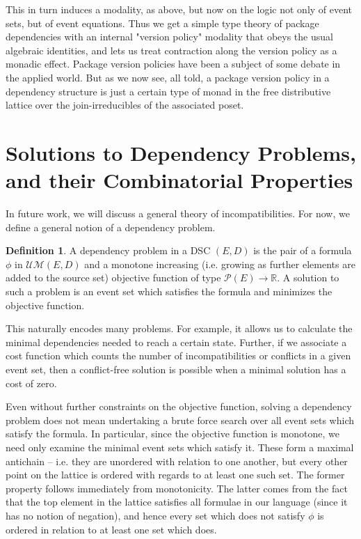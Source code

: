 \documentclass[hoptionsi,review,format=acmsmall]{acmart}
\theoremstyle{definition}
\newtheorem{definition}{Definition}[section]
\newcommand{\UMc}{\mathcal{UM}}
\newcommand{\Pc}{\mathcal{P}}
\begin{document}
This in turn induces a modality, as above, but now on the logic not only of event sets, but of event equations. Thus we get a simple type theory of package dependencies with an internal "version policy" modality that obeys the usual algebraic identities, and lets us treat contraction along the version policy as a monadic effect. Package version policies have been a subject of some debate in the applied world. But as we now see, all told, a package version policy in a dependency structure is just a certain type of monad in the free distributive lattice over the join-irreducibles of the associated poset.


\section{Solutions to Dependency Problems, and their Combinatorial Properties}
In future work, we will discuss a general theory of incompatibilities. For now, we define a general notion of a dependency problem.

\begin{definition}
A dependency problem in a DSC \((E,D)\) is the pair of a formula \(\phi\) in \(\UMc(E,D)\) and a monotone increasing (i.e. growing as further elements are added to the source set) objective function of type \(\Pc(E) \rightarrow \mathbb{R}\). A solution to such a problem is an event set which satisfies the formula and minimizes the objective function.
\end{definition}

This naturally encodes many problems. For example, it allows us to calculate the minimal dependencies needed to reach a certain state. Further, if we associate a cost function which counts the number of incompatibilities or conflicts in a given event set, then a conflict-free solution is possible when a minimal solution has a cost of zero.

Even without further constraints on the objective function, solving a dependency problem does not mean undertaking a brute force search over all event sets which satisfy the formula. In particular, since the objective function is monotone, we need only examine the minimal event sets which satisfy it. These form a maximal  antichain -- i.e. they are unordered with relation to one another, but every other point on the lattice is ordered with regards to at least one such set. The former property follows immediately from monotonicity. The latter comes from the fact that the top element in the lattice satisfies all formulae in our language (since it has no notion of negation), and hence every set which does not satisfy \(\phi\) is ordered in relation to at least one set which does.
\end{document}
